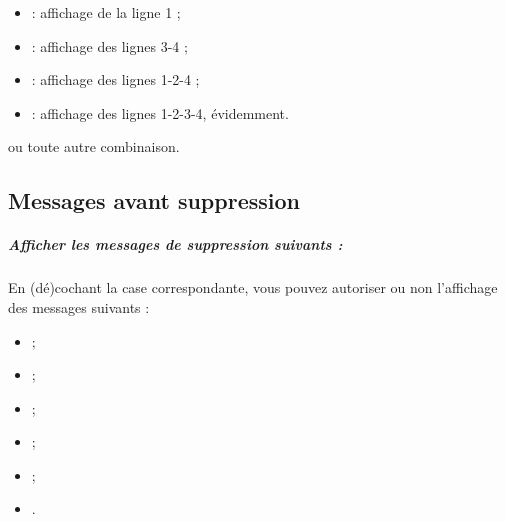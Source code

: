 \begin{itemize}
	\item {} : affichage de la ligne 1 ;
	\item {} : affichage des lignes 3-4 ;
	\item {} : affichage des lignes 1-2-4 ;
	\item {} : affichage des lignes 1-2-3-4, évidemment.
\end{itemize}

ou toute autre combinaison.


\subsection{Messages avant suppression\label{setup-operations-remove}}

\subparagraph{Afficher les messages de suppression suivants :}

En (dé)cochant la case correspondante, vous pouvez autoriser ou non l'affichage des messages suivants :

\begin{itemize}
	\ifIllustration
	\label{setup-messagesDelete-img}
	\fi
	\item {} ;
	\item {} ;
	\item {} ;
	\item {} ;
	\item {} ; 
	\item {}.
\end{itemize}

